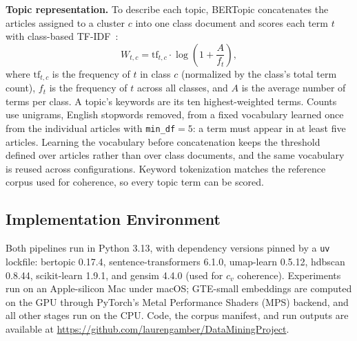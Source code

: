 \documentclass[conference]{IEEEtran}
\begin{document}
\textbf{Topic representation.} To describe each topic, BERTopic concatenates the articles assigned to a cluster $c$ into one class document and scores each term $t$ with class-based TF-IDF~\cite{grootendorst2022bertopic}:
\begin{equation}
W_{t,c} = \mathrm{tf}_{t,c}\cdot\log\!\left(1+\frac{A}{f_t}\right),
\label{eq:ctfidf}
\end{equation}
where $\mathrm{tf}_{t,c}$ is the frequency of $t$ in class $c$ (normalized by the class's total term count), $f_t$ is the frequency of $t$ across all classes, and $A$ is the average number of terms per class. A topic's keywords are its ten highest-weighted terms. Counts use unigrams, English stopwords removed, from a fixed vocabulary learned once from the individual articles with \texttt{min\_df}$=5$: a term must appear in at least five articles. Learning the vocabulary before concatenation keeps the threshold defined over articles rather than over class documents, and the same vocabulary is reused across configurations. Keyword tokenization matches the reference corpus used for coherence, so every topic term can be scored.

\subsection*{Implementation Environment}
Both pipelines run in Python 3.13, with dependency versions pinned by a \texttt{uv} lockfile: bertopic 0.17.4, sentence-transformers 6.1.0, umap-learn 0.5.12, hdbscan 0.8.44, scikit-learn 1.9.1, and gensim 4.4.0 (used for $c_v$ coherence). Experiments run on an Apple-silicon Mac under macOS; GTE-small embeddings are computed on the GPU through PyTorch's Metal Performance Shaders (MPS) backend, and all other stages run on the CPU. Code, the corpus manifest, and run outputs are available at \url{https://github.com/laurengamber/DataMiningProject}.
\end{document}
